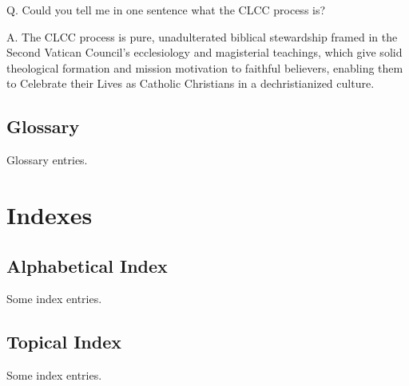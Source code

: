 \documentclass[oneside]{book}
\begin{document}
Q. Could you tell me in one sentence what the CLCC process is?

A. The CLCC process is pure, unadulterated biblical stewardship framed in the
Second Vatican Council's ecclesiology and magisterial teachings, which give
solid theological formation and mission motivation to faithful believers,
enabling them to Celebrate their Lives as Catholic Christians in a
dechristianized culture.


\chapter{Glossary}

Glossary entries.


\backmatter
\part{Indexes}


\chapter{Alphabetical Index}

Some index entries.


\chapter{Topical Index}

Some index entries.


\part{}

\end{document}
